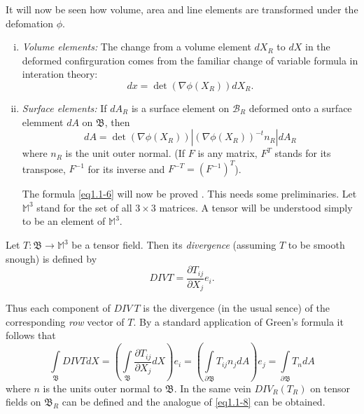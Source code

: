 It will now be seen how volume, area and line elements are transformed
under the defomation $\phi$. 
\begin{enumerate}[(i)]
\item \textit{Volume elements:} The change from a volume element
 $dX_R$ to $dX$ in the deformed confirguration comes from the
 familiar change of variable formula in interation theory: 
\begin{equation*}
 dx = \det (\nabla  \phi (X_R)) dX_R. \tag{1.1-5}\label{eq1.1-5}
\end{equation*}

\item \textit{Surface elements:} If $dA_R$ is a surface element on
 $\mathscr{B}_R$ deformed onto a surface elemment $dA$ on
 $\mathfrak{B}$, then 
\begin{equation*}
  dA = \det (\nabla  \phi (X_R)) | (\nabla  \phi
  (X_R))^{-t} n_R | dA_R \tag{1.1-6} \label{eq1.1-6}
\end{equation*}\pageoriginale 
where $n_R$ is the unit outer normal. (If $F$ is any matrix, $F^T$
stands for its transpose, $F^{-1}$ for its inverse and $F^{-T} =
(F^{-1})^T$). 

The formula \eqref{eq1.1-6} will now be proved . This needs some
preliminaries. Let $\mathbb{M}^3$ stand for the set of all $3 \times
3$ matrices. A tensor will be understood simply to be an element of
$\mathbb{M}^3$.  
\end{enumerate}

Let $T : \mathfrak{B} \to \mathbb{M}^3$ be a tensor field. Then
its \textit{divergence} (assuming $T$ to be smooth snough) is defined
by 
\begin{equation*}
  DIV T = \frac{\partial T_{ij}}{\partial X_j}
  e_i. \tag{1.1-7}\label{eq1.1-7} 
\end{equation*}

Thus each component of $DIV ~ T$ is the divergence (in the usual
sence) of the corresponding \textit{row} vector of $T$. By a standard
application of Green's formula it follows that 
\begin{equation*}
  \int \limits_\mathfrak{B} DIV T dX = \left(\int\limits_\mathfrak{B}
  \frac{\partial T_{ij}}{\partial X_j} dX \right) e_i = \left( \int
  \limits_\mathfrak{\partial B} T_{ij} n_j dA \right) e_j = \int \limits_{\partial
    \mathfrak{B}} T_n dA \tag{1.1-8} \label{eq1.1-8}
\end{equation*}
where $n$ is the units outer normal to $\mathfrak{B}$. In the same
vein $DIV_R (T_R)$ on tensor fields on $\mathfrak{B}_R$ can be defined
and the analogue of \eqref{eq1.1-8} can be obtained. 


